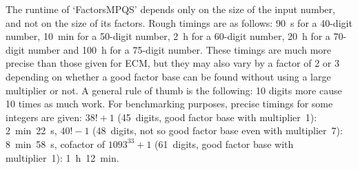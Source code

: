 
The runtime of `FactorsMPQS' depends only on the size of the input
number, and not on the size of its factors.
Rough timings are as follows: 90~s for a 40-digit number, 10~min for a
50-digit number, 2~h for a 60-digit number, 20~h for a 70-digit
number and 100~h for a 75-digit number.
These timings are much more precise than those given for ECM, but they
may also vary by a factor of 2 or 3 depending on whether a good factor
base can be found without using a large multiplier or not.
A general rule of thumb is the following: 10 digits more cause 10 times
as much work. 
For benchmarking purposes, precise timings for some integers are given:
$38!+1$ (45~digits, good factor base with
multiplier~1): 2~min~22~s, $40!-1$ (48~digits, not so good factor
base even with multiplier~7): 8~min~58~s, cofactor of $1093^{33}+1$
(61~digits, good factor base with multiplier~1): 1~h~12~min.

